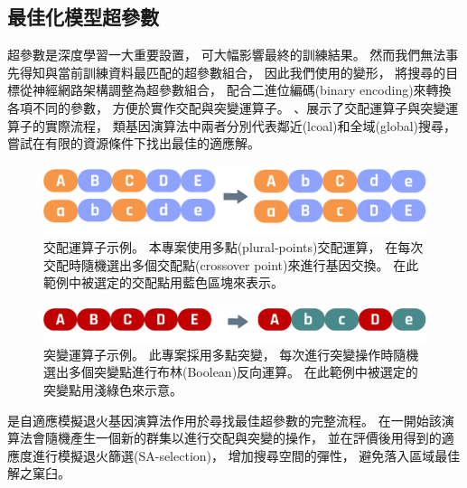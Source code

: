\documentclass[a4paper,14pt]{extarticle}
\begin{document}
        \subsection{最佳化模型超參數}
            超參數是深度學習一大重要設置，
            可大幅影響最終的訓練結果。
            然而我們無法事先得知與當前訓練資料最匹配的超參數組合，
            因此我們使用的變形，
            將搜尋的目標從神經網路架構調整為超參數組合，
            配合二進位編碼(binary encoding)來轉換各項不同的參數，
            方便於實作交配與突變運算子。
            、展示了交配運算子與突變運算子的實際流程，
            類基因演算法中兩者分別代表鄰近(lcoal)和全域(global)搜尋，
            嘗試在有限的資源條件下找出最佳的適應解。
            \begin{figure}[htbp]
                \centering
                \includegraphics[width=\textwidth]{crossover.pdf}
                \caption{
                    交配運算子示例。
                    本專案使用多點(plural-points)交配運算，
                    在每次交配時隨機選出多個交配點(crossover point)來進行基因交換。
                    在此範例中被選定的交配點用藍色區塊來表示。
                }
                \label{fig:crossover}
            \end{figure}
            \begin{figure}[htbp]
                \centering
                \includegraphics[width=\textwidth]{mutation.pdf}
                \caption{
                    突變運算子示例。
                    此專案採用多點突變，
                    每次進行突變操作時隨機選出多個突變點進行布林(Boolean)反向運算。
                    在此範例中被選定的突變點用淺綠色來示意。
                }
                \label{fig:mutation}
            \end{figure}

            是自適應模擬退火基因演算法作用於尋找最佳超參數的完整流程。
            在一開始該演算法會隨機產生一個新的群集以進行交配與突變的操作，
            並在評價後用得到的適應度進行模擬退火篩選(SA-selection)，
            增加搜尋空間的彈性，
            避免落入區域最佳解之窠臼。
\end{document}
